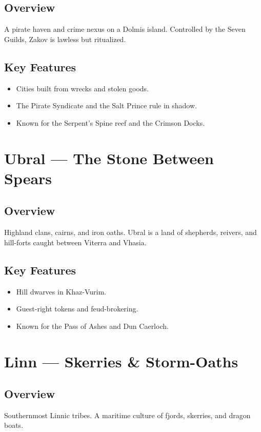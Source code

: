 \subsection*{Overview}
A pirate haven and crime nexus on a Dolmis island. Controlled by the Seven Guilds, Zakov is lawless but ritualized.

\subsection*{Key Features}
\begin{itemize}[leftmargin=*]
    \item Cities built from wrecks and stolen goods.
    \item The Pirate Syndicate and the Salt Prince rule in shadow.
    \item Known for the Serpent’s Spine reef and the Crimson Docks.
\end{itemize}

\section{Ubral — The Stone Between Spears}
\label{sec:lore-ubral}

\subsection*{Overview}
Highland clans, cairns, and iron oaths. Ubral is a land of shepherds, reivers, and hill-forts caught between Viterra and Vhasia.

\subsection*{Key Features}
\begin{itemize}[leftmargin=*]
    \item Hill dwarves in Khaz-Vurim.
    \item Guest-right tokens and feud-brokering.
    \item Known for the Pass of Ashes and Dun Caerloch.
\end{itemize}

\section{Linn — Skerries \& Storm-Oaths}
\label{sec:lore-linn}

\subsection*{Overview}
Southernmost Linnic tribes. A maritime culture of fjords, skerries, and dragon boats.

